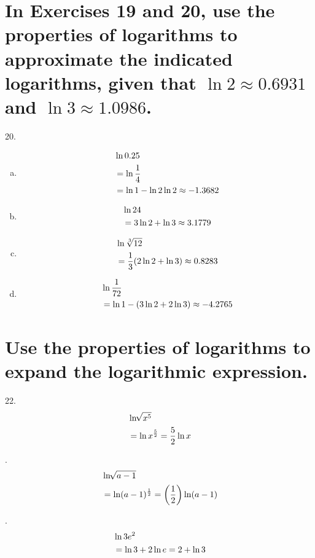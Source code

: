 \documentclass[11pt]{article}
\newcommand*{\vs}{\vspace{1cm}}
\newcommand*{\next}{\noindent}
\newcommand*{\set}{\setcounter{equation}{0}}
\newcommand*{\lt}{\left}
\newcommand*{\rt}{\right}
\begin{document}
\section{In Exercises 19 and 20, use the properties of logarithms to
approximate the indicated logarithms, given that $\ln 2\approx 0.6931$ and $\ln 3\approx 1.0986$.}
20.\begin{enumerate}[(a)]
    \item
        \begin{align}
            \set
            &\ln 0.25\\
            &=\ln\frac{1}{4}\\
            &=\ln 1-\ln 2\ln 2\approx -1.3682
        \end{align}
    \item
        \begin{align}
            \set
            &\ln 24\\
            &=3\ln 2+\ln 3\approx 3.1779
        \end{align}
    \item
        \begin{align}
            \set
            &\ln\sqrt[3]{12}\\
            &=\frac{1}{3}(2\ln 2+\ln 3)\approx 0.8283
        \end{align}
    \item
        \begin{align}
            \set
            &\ln\frac{1}{72}\\
            &=\ln 1-(3\ln 2+2\ln 3)\approx -4.2765
        \end{align}
\end{enumerate}

\section{Use the properties of logarithms to expand
the logarithmic expression.}
22.\begin{align}
    \set
    &\ln\sqrt[]{x^5}\\
    &=\ln x^{\frac{5}{2}}=\frac{5}{2}\ln x
\end{align}

\vs\next
26.\begin{align}
    \set
    &\ln\sqrt[]{a-1}\\
    &=\ln(a-1)^{\frac{1}{2}}=\lt(\frac{1}{2}\rt)\ln(a-1)
\end{align}

\vs\next
28.\begin{align}
    \set
    &\ln 3e^2\\
    &=\ln 3+2\ln e=2+\ln 3
\end{align}
\end{document}
